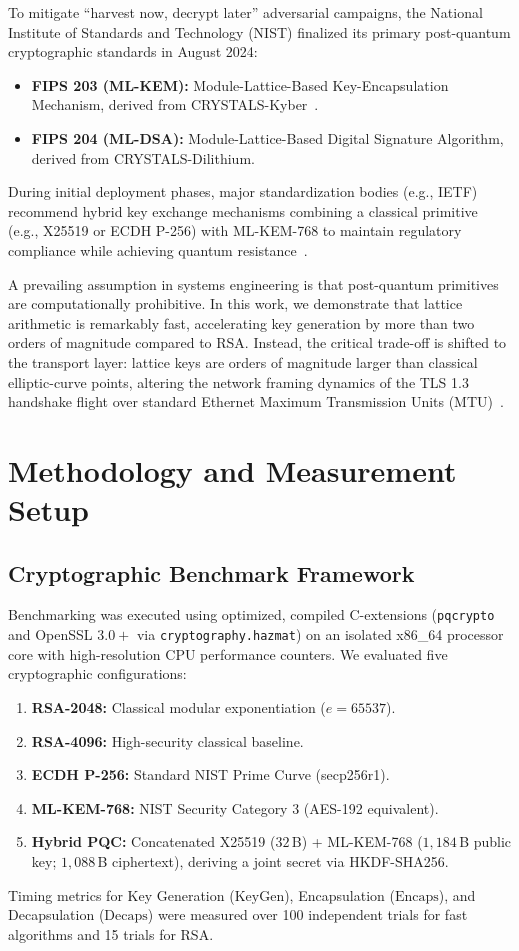 To mitigate ``harvest now, decrypt later'' adversarial campaigns, the National Institute of Standards and Technology (NIST) finalized its primary post-quantum cryptographic standards in August 2024:
\begin{itemize}
    \item \textbf{FIPS 203 (ML-KEM):} Module-Lattice-Based Key-Encapsulation Mechanism, derived from CRYSTALS-Kyber~\cite{bos2018}.
    \item \textbf{FIPS 204 (ML-DSA):} Module-Lattice-Based Digital Signature Algorithm, derived from CRYSTALS-Dilithium.
\end{itemize}

During initial deployment phases, major standardization bodies (e.g., IETF) recommend hybrid key exchange mechanisms combining a classical primitive (e.g., X25519 or ECDH P-256) with ML-KEM-768 to maintain regulatory compliance while achieving quantum resistance~\cite{schwabe2020}.

A prevailing assumption in systems engineering is that post-quantum primitives are computationally prohibitive. In this work, we demonstrate that lattice arithmetic is remarkably fast, accelerating key generation by more than two orders of magnitude compared to RSA. Instead, the critical trade-off is shifted to the transport layer: lattice keys are orders of magnitude larger than classical elliptic-curve points, altering the network framing dynamics of the TLS 1.3 handshake flight over standard Ethernet Maximum Transmission Units (MTU)~\cite{paquin2020,sikeridis2020}.

\section{Methodology and Measurement Setup}

\subsection{Cryptographic Benchmark Framework}
Benchmarking was executed using optimized, compiled C-extensions (\texttt{pqcrypto} and OpenSSL $3.0+$ via \texttt{cryptography.hazmat}) on an isolated x86\_64 processor core with high-resolution CPU performance counters. We evaluated five cryptographic configurations:
\begin{enumerate}
    \item \textbf{RSA-2048:} Classical modular exponentiation ($e=65537$).
    \item \textbf{RSA-4096:} High-security classical baseline.
    \item \textbf{ECDH P-256:} Standard NIST Prime Curve (secp256r1).
    \item \textbf{ML-KEM-768:} NIST Security Category 3 (AES-192 equivalent).
    \item \textbf{Hybrid PQC:} Concatenated X25519 ($32\,$B) + ML-KEM-768 ($1{,}184\,$B public key; $1{,}088\,$B ciphertext), deriving a joint secret via HKDF-SHA256.
\end{enumerate}
Timing metrics for Key Generation ($\mathrm{KeyGen}$), Encapsulation ($\mathrm{Encaps}$), and Decapsulation ($\mathrm{Decaps}$) were measured over 100 independent trials for fast algorithms and 15 trials for RSA.

